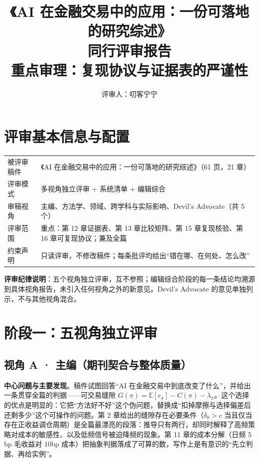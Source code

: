 \documentclass[11pt,a4paper]{ctexart}
\title{\bfseries 《AI 在金融交易中的应用：一份可落地的研究综述》\\ 同行评审报告\\\large 重点审理：复现协议与证据表的严谨性}
\author{\large 评审人：叨客宁宁}
\date{}
\begin{document}
\maketitle

\section*{评审基本信息与配置}

\begin{table}[htbp]
\centering
\begin{tabular}{@{}>{\raggedright\arraybackslash}p{3.4cm}>{\raggedright\arraybackslash}p{11.0cm}@{}}
\toprule
被评审稿件 & 《AI 在金融交易中的应用：一份可落地的研究综述》（61 页，21 章） \\
评审模式 & 多视角独立评审 + 系统清单 + 编辑综合 \\
审稿视角 & 主编、方法学、领域、跨学科与实际影响、Devil's Advocate（共 5 个） \\
评审范围 & 重点：第 12 章证据表、第 13 章比较矩阵、第 15 章复现核验、第 16 章可复现协议；兼及全篇 \\
约束声明 & 只读评审，不修改稿件；每条批评均给出“错在哪、在何处、怎么改” \\
\bottomrule
\end{tabular}
\end{table}

\noindent\textbf{评审纪律说明}：五个视角独立评审，互不参照；编辑综合阶段的每一条结论均溯源到具体视角报告，未引入任何视角之外的新意见。Devil's Advocate 的意见单独列示，不与其他视角混合。

\section{阶段一：五视角独立评审}

\subsection{视角 A · 主编（期刊契合与整体质量）}

\textbf{中心问题与主要发现}。稿件试图回答“AI 在金融交易中到底改变了什么”，并给出一条贯穿全篇的判据——可交易缝隙 $G(\pi)=\mathbb{E}[r_\pi]-C(\pi)-\lambda_\pi$。这个选择的优点是明显的：它把“方法好不好”这个伪问题，替换成“扣掉摩擦与选择偏差后还剩多少”这个可操作的问题。第 2 章给出的缝隙存在必要条件（$\delta_0>c$ 当且仅当存在正收益调仓周期）是全篇最漂亮的段落：推导只有两行，却同时解释了高频策略对成本的敏感性、以及低频信号被迫降频的现象。第 11 章的成本分解（日频 $5$bp 毛收益对 $10$bp 成本）把抽象判据落成了可算的数，写作上是有意识的“先立判据、再给实例”。
\end{document}
